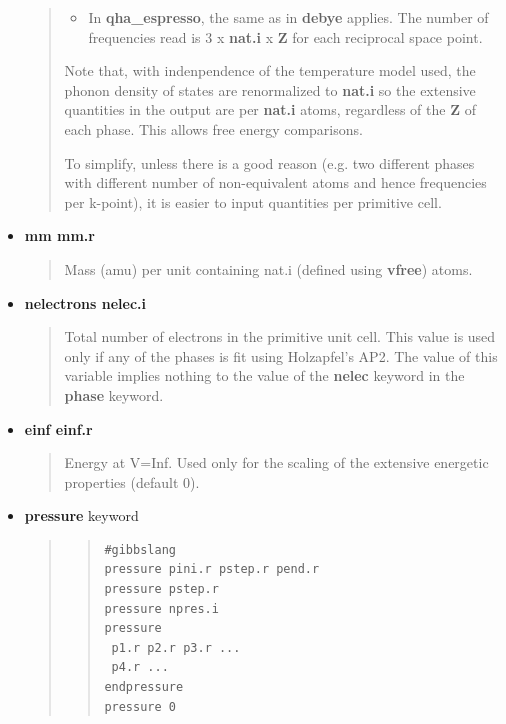 \documentclass[a4paper]{article}
\begin{document}
\begin{itemize}
\begin{quote}
\begin{itemize}
\item In \textbf{qha\_espresso}, the same as in \textbf{debye} applies. The number
of frequencies read is 3 x \textbf{nat.i} x \textbf{Z} for each reciprocal
space point.
\end{itemize}

Note that, with indenpendence of the temperature model used, the
phonon density of states are renormalized to \textbf{nat.i} so the
extensive quantities in the output are per \textbf{nat.i} atoms,
regardless of the \textbf{Z} of each phase. This allows free energy
comparisons.

To simplify, unless there is a good reason (e.g. two different
phases with different number of non-equivalent atoms and hence
frequencies per k-point), it is easier to input quantities per
primitive cell.
\end{quote}

\item \textbf{mm mm.r}

\begin{quote}
Mass (amu) per unit containing nat.i (defined using \textbf{vfree})
atoms.
\end{quote}

\item \textbf{nelectrons nelec.i}

\begin{quote}
Total number of electrons in the primitive unit cell. This value is
used only if any of the phases is fit using Holzapfel's AP2. The
value of this variable implies nothing to the value of the
\textbf{nelec} keyword in the \textbf{phase} keyword.
\end{quote}

\item \textbf{einf einf.r}

\begin{quote}
Energy at V=Inf. Used only for the scaling of the extensive
energetic properties (default 0).
\end{quote}

\item \textbf{pressure} keyword

\begin{quote}
\begin{quote}
\begin{verbatim}
#gibbslang
pressure pini.r pstep.r pend.r
pressure pstep.r
pressure npres.i
pressure
 p1.r p2.r p3.r ...
 p4.r ...
endpressure
pressure 0
\end{verbatim}
\end{quote}


\end{quote}
\end{itemize}
\end{document}
